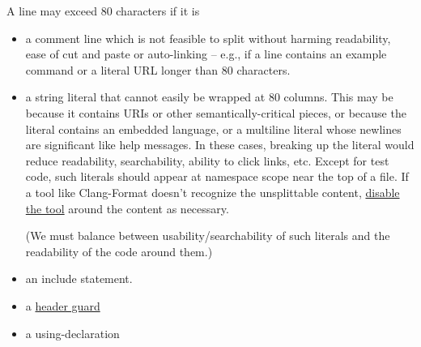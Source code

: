 A line may exceed 80 characters if it is
\begin{itemize}
    \item a comment line which is not feasible to split without harming readability, ease of cut and paste or auto-linking -- e.g., if a line contains an example command or a literal URL longer than 80 characters.
    \item a string literal that cannot easily be wrapped at 80 columns. This may be because it contains URIs or other semantically-critical pieces, or because the literal contains an embedded language, or a multiline literal whose newlines are significant like help messages. In these cases, breaking up the literal would reduce readability, searchability, ability to click links, etc. Except for test code, such literals should appear at namespace scope near the top of a file. If a tool like Clang-Format doesn't recognize the unsplittable content, \href{https://clang.llvm.org/docs/ClangFormatStyleOptions.html#disabling-formatting-on-a-piece-of-code}{disable the tool} around the content as necessary.

    (We must balance between usability/searchability of such literals and the readability of the code around them.)
    \item an include statement.
    \item a \hyperref[sec:the-define-guard]{header guard}
    \item a using-declaration
\end{itemize}

